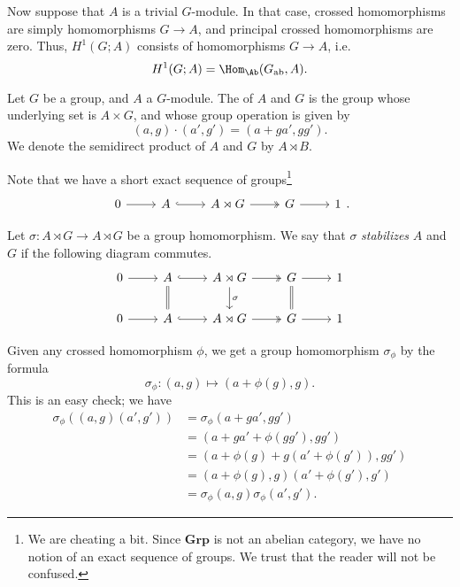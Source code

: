 \documentclass[main.tex]{subfiles}
\begin{document}
Now suppose that $A$ is a trivial $G$-module. In that case, crossed homomorphisms are simply homomorphisms $G \to A$, and principal crossed homomorphisms are zero. Thus, $H^{1}(G; A)$ consists of homomorphisms $G \to A$, i.e.\
\begin{equation*}
  H^{1}(G; A) = \Hom_{\Ab}(G_{\mathrm{ab}}, A).
\end{equation*}

\begin{definition}
  \label{def:semidirect_product}
  Let $G$ be a group, and $A$ a $G$-module. The  of $A$ and $G$ is the group whose underlying set is $A \times G$, and whose group operation is given by
  \begin{equation*}
    (a, g) \cdot (a', g') = (a + g a', gg').
  \end{equation*}
  We denote the semidirect product of $A$ and $G$ by $A \rtimes B$.
\end{definition}

Note that we have a short exact sequence of groups\footnote{We are cheating a bit. Since $\mathbf{Grp}$ is not an abelian category, we have no notion of an exact sequence of groups. We trust that the reader will not be confused.}
\begin{equation*}
  \begin{tikzcd}
    0
    \arrow[r]
    & A
    \arrow[r, hook]
    & A \rtimes G
    \arrow[r, two heads]
    & G
    \arrow[r]
    & 1
  \end{tikzcd}.
\end{equation*}

Let $\sigma\colon A \rtimes G \to A \rtimes G$ be a group homomorphism. We say that $\sigma$ \emph{stabilizes} $A$ and $G$ if the following diagram commutes.
\begin{equation*}
  \begin{tikzcd}
    0
    \arrow[r]
    & A
    \arrow[r, hook]
    \arrow[d, equals]
    & A \rtimes G
    \arrow[r, two heads]
    \arrow[d, "\sigma"]
    & G
    \arrow[r]
    \arrow[d, equals]
    & 1
    \\
    0
    \arrow[r]
    & A
    \arrow[r, hook]
    & A \rtimes G
    \arrow[r, two heads]
    & G
    \arrow[r]
    & 1
  \end{tikzcd}
\end{equation*}

Given any crossed homomorphism $\phi$, we get a group homomorphism $\sigma_{\phi}$ by the formula
\begin{equation*}
  \sigma_{\phi}\colon (a, g) \mapsto (a + \phi(g), g).
\end{equation*}
This is an easy check; we have
\begin{align*}
  \sigma_{\phi}((a, g)(a', g')) &= \sigma_{\phi}(a + ga', gg') \\
  &= (a + ga' + \phi(gg'), gg') \\
  &= (a + \phi(g) + g(a' + \phi(g')), gg') \\
  &= (a + \phi(g), g)(a' + \phi(g'), g') \\
  &= \sigma_{\phi}(a, g)\sigma_{\phi}(a', g').
\end{align*}
\end{document}
